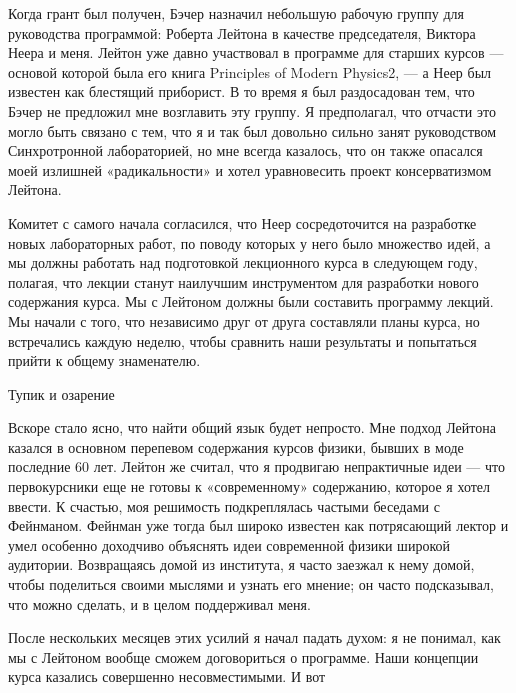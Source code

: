 \documentclass[10pt,oneside]{article}
\begin{document}
Когда грант был получен, Бэчер назначил небольшую рабочую группу для руководства программой: Роберта Лейтона в качестве председателя, Виктора Неера и меня. Лейтон уже давно участвовал в программе для старших курсов --- основой которой была его книга Principles of Modern Physics2, --- а Неер был известен как блестящий приборист. В то время я был раздосадован тем, что Бэчер не предложил мне возглавить эту группу. Я предполагал, что отчасти это могло быть связано с тем, что я и так был довольно сильно занят руководством Синхротронной лабораторией, но мне всегда казалось, что он также опасался моей излишней «радикальности» и хотел уравновесить проект консерватизмом Лейтона.\par

Комитет с самого начала согласился, что Неер сосредоточится на разработке новых лабораторных работ, по поводу которых у него было множество идей, а мы должны работать над подготовкой лекционного курса в следующем году, полагая, что лекции станут наилучшим инструментом для разработки нового содержания курса. Мы с Лейтоном должны были составить программу лекций. Мы начали с того, что независимо друг от друга составляли планы курса, но встречались каждую неделю, чтобы сравнить наши результаты и попытаться прийти к общему знаменателю.\par

Тупик и озарение\par

Вскоре стало ясно, что найти общий язык будет непросто. Мне подход Лейтона казался в основном перепевом содержания курсов физики, бывших в моде последние 60 лет. Лейтон же считал, что я продвигаю непрактичные идеи --- что первокурсники еще не готовы к «современному» содержанию, которое я хотел ввести. К счастью, моя решимость подкреплялась частыми беседами с Фейнманом. Фейнман уже тогда был широко известен как потрясающий лектор и умел особенно доходчиво объяснять идеи современной физики широкой аудитории. Возвращаясь домой из института, я часто заезжал к нему домой, чтобы поделиться своими мыслями и узнать его мнение; он часто подсказывал, что можно сделать, и в целом поддерживал меня.\par

После нескольких месяцев этих усилий я начал падать духом: я не понимал, как мы с Лейтоном вообще сможем договориться о программе. Наши концепции курса казались совершенно несовместимыми. И вот\par
\end{document}
